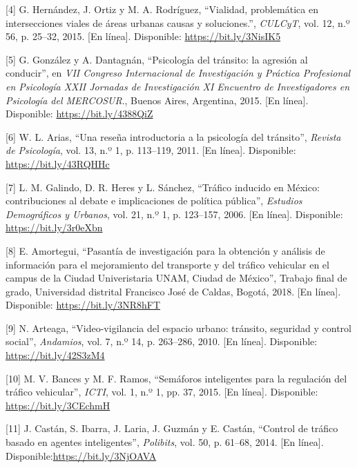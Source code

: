 \documentclass[12pt]{article}
\begin{document}
    [4] G. Hernández, J. Ortiz y M. A. Rodríguez, ``Vialidad, problemática en intersecciones viales de áreas urbanas causas y soluciones.'', \textit{CULCyT}, vol. 12, n.º 56, p. 25–32, 2015. [En línea]. Disponible: \url{https://bit.ly/3NisIK5}
    \hfil \break

    [5] G. González y A. Dantagnán, ``Psicología del tránsito: la agresión al conducir'', en \textit{VII Congreso Internacional de Investigación y Práctica Profesional en Psicología XXII Jornadas de Investigación XI Encuentro de Investigadores en Psicología del MERCOSUR}., Buenos Aires, Argentina, 2015. [En línea]. Disponible: \url{https://bit.ly/4388QiZ}
    \hfil \break

    [6] W. L. Arias, ``Una reseña introductoria a la psicología del tránsito'', \textit{Revista de Psicología}, vol. 13, n.º 1, p. 113–119, 2011. [En línea]. Disponible: \url{https://bit.ly/43RQHHc}
    \hfil \break

    [7] L. M. Galindo, D. R. Heres y L. Sánchez, ``Tráfico inducido en México: contribuciones al debate e implicaciones de política pública'', \textit{Estudios Demográficos y Urbanos}, vol. 21, n.º 1, p. 123–157, 2006. [En línea]. Disponible: \url{https://bit.ly/3r0eXbn}
    \hfil \break

    [8] E. Amortegui, ``Pasantía de investigación para la obtención y análisis de información para el mejoramiento del transporte y del tráfico vehicular en el campus de la Ciudad Univeristaria UNAM, Ciudad de México'', Trabajo final de grado, Universidad distrital Francisco José de Caldas, Bogotá, 2018. [En línea]. Disponible: \url{https://bit.ly/3NR8hFT}
    \hfil \break

    [9] N. Arteaga, ``Video-vigilancia del espacio urbano: tránsito, seguridad y control social'', \textit{Andamios}, vol. 7, n.º 14, p. 263–286, 2010. [En línea]. Disponible: \url{https://bit.ly/42S3zM4}
    \hfil \break

    [10] M. V. Bances y M. F. Ramos, ``Semáforos inteligentes para la regulación del tráfico vehicular'', \textit{ICTI}, vol. 1, n.º 1, pp. 37, 2015. [En línea]. Disponible: \url{https://bit.ly/3CEchmH}
    \hfil \break

    [11] J. Castán, S. Ibarra, J. Laria, J. Guzmán y E. Castán, ``Control de tráfico basado en agentes inteligentes'', \textit{Polibits}, vol. 50, p. 61–68, 2014. [En línea]. Disponible:\url{https://bit.ly/3NjOAVA}
    \hfil \break
\end{document}
